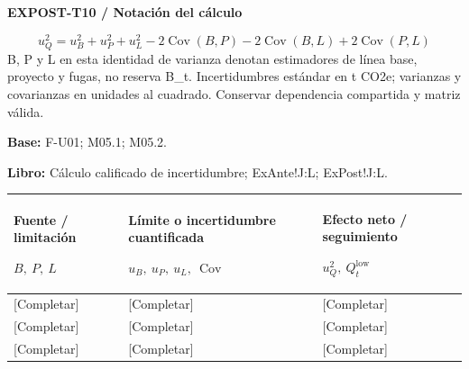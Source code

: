 \par\begingroup\sffamily\fontsize{8}{10}\selectfont\color{NEBGreen}\setlength{\parskip}{2pt}\setlength{\abovedisplayskip}{4pt}\setlength{\belowdisplayskip}{4pt}\setlength{\abovedisplayshortskip}{2pt}\setlength{\belowdisplayshortskip}{3pt}
\textbf{EXPOST-T10 / Notación del cálculo}\par
{\fontsize{9}{11}\selectfont\[ u_Q^2=u_B^2+u_P^2+u_L^2-2\operatorname{Cov}(B,P)-2\operatorname{Cov}(B,L)+2\operatorname{Cov}(P,L) \]}
B, P y L en esta identidad de varianza denotan estimadores de línea base, proyecto y fugas, no reserva B\_t. Incertidumbres estándar en t CO2e; varianzas y covarianzas en unidades al cuadrado. Conservar dependencia compartida y matriz válida.\par
\textbf{Base:} F-U01; M05.1; M05.2.\par
\textbf{Libro:} Cálculo calificado de incertidumbre; ExAnte!J:L; ExPost!J:L.\par\endgroup
{\sffamily\fontsize{8.3}{10.3}\selectfont\begin{longtable}{@{}P{54.83mm} P{54.83mm} P{54.83mm}@{}}
\toprule
\textbf{Fuente / limitación}\par {\normalfont\fontsize{8.2}{10}\selectfont $B,\ P,\ L$} & \textbf{Límite o incertidumbre cuantificada}\par {\normalfont\fontsize{8.2}{10}\selectfont $u_B,\ u_P,\ u_L,\ \operatorname{Cov}$} & \textbf{Efecto neto / seguimiento}\par {\normalfont\fontsize{8.2}{10}\selectfont $u_Q^2,\ Q_t^{\mathrm{low}}$}\\\midrule\endhead
\rule{0pt}{8mm}[Completar] & [Completar] & [Completar]\\\hline
\rule{0pt}{8mm}[Completar] & [Completar] & [Completar]\\\hline
\rule{0pt}{8mm}[Completar] & [Completar] & [Completar]\\\hline
\end{longtable}}
